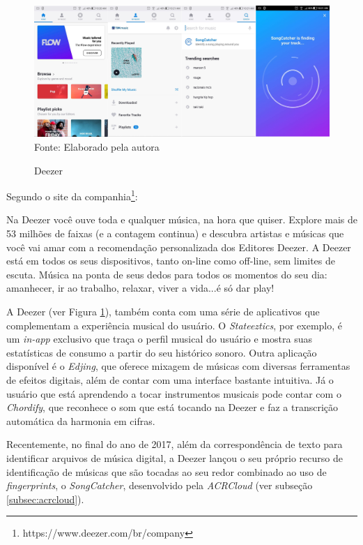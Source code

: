 \begin{figure}[!htb]
   \centering
   \caption{Deezer}\label{fig:deezer} 
   \includegraphics[scale=0.13]{figuras/deezer.jpg}
   \\Fonte: Elaborado pela autora
\end{figure}

Segundo o site da companhia\footnote{https://www.deezer.com/br/company}:

\begin{citacao}
Na Deezer você ouve toda e qualquer música, na hora que quiser. Explore mais de 53 milhões de faixas (e a contagem continua) e descubra artistas e músicas que você vai amar com a recomendação personalizada dos Editores Deezer. A Deezer está em todos os seus dispositivos, tanto on-line como off-line, sem limites de escuta. Música na ponta de seus dedos para todos os momentos do seu dia: amanhecer, ir ao trabalho, relaxar, viver a vida...é só dar play! \cite{deezer2006}
\end{citacao}

A Deezer (ver Figura \ref{fig:deezer}), também conta com uma série de aplicativos que complementam a experiência musical do usuário. O \textit{Stateeztics}, por exemplo, é um \textit{in-app} exclusivo que traça o perfil musical do usuário e mostra suas estatísticas de consumo a partir do seu histórico sonoro. Outra aplicação disponível é o \textit{Edjing}, que oferece mixagem de músicas com diversas ferramentas de efeitos digitais, além de contar com uma interface bastante intuitiva. Já o usuário que está aprendendo a tocar instrumentos musicais pode contar com o \textit{Chordify}, que reconhece o som que está tocando na Deezer e faz a transcrição automática da harmonia em cifras.

Recentemente, no final do ano de 2017, além da correspondência de texto para identificar arquivos de música digital, a Deezer lançou o seu próprio recurso de identificação de músicas que são tocadas ao seu redor combinado ao uso de \textit{fingerprints}, o \textit{SongCatcher}, desenvolvido pela \textit{ACRCloud} (ver subseção \ref{subsec:acrcloud}).

